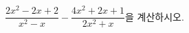 \hspace*{2mm}\begin{minipage}[t]{\dimexpr\linewidth-2mm\relax}\vspace{0pt}
$\dfrac{2x^2-2x+2}{x^2-x}-\dfrac{4x^2+2x+1}{2x^2+x}$을 계산하시오.\end{minipage}
